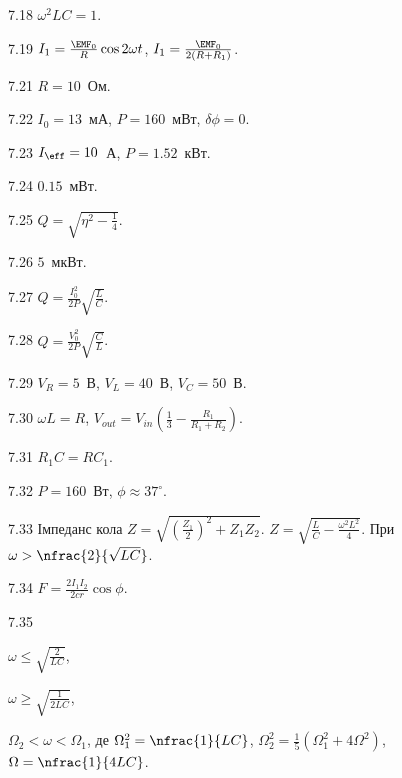 \begin{Solution}{7.{18}}
	$\omega^2LC = 1$.
\end{Solution}
\begin{Solution}{7.{19}}
	$I_1 = \frac{\EMF_0}{R}\cos 2\omega t$, $I_1 = \frac{\EMF_0}{2(R + R_1)}$.
\end{Solution}
\begin{Solution}{7.{21}}
	$R = 10$~Ом.
\end{Solution}
\begin{Solution}{7.{22}}
	$I_0 = 13$~мА, $P = 160$~мВт, $\delta\phi = 0$.
\end{Solution}
\begin{Solution}{7.{23}}
	$I_{\eff} = 10$~А, $P = 1.52$~кВт.
\end{Solution}
\begin{Solution}{7.{24}}
	$0.15$~мВт.
\end{Solution}
\begin{Solution}{7.{25}}
	$Q = \sqrt{\eta^2 - \frac14}$.
\end{Solution}
\begin{Solution}{7.{26}}
	$5$~мкВт.
\end{Solution}
\begin{Solution}{7.{27}}
	$Q = \frac{I_0^2}{2P}\sqrt{\frac{L}{C}}$.
\end{Solution}
\begin{Solution}{7.{28}}
	$Q = \frac{V_0^2}{2P}\sqrt{\frac{C}{L}}$.
\end{Solution}
\begin{Solution}{7.{29}}
	$V_R = 5$~В, $V_L = 40$~В, $V_C = 50$~В.
\end{Solution}
\begin{Solution}{7.{30}}
	$\omega L = R$, $V_{out} = V_{in} \left( \frac13 - \frac{R_1}{R_1 + R_2}\right) $.
\end{Solution}
\begin{Solution}{7.{31}}
	$R_1C = RC_1$.
\end{Solution}
\begin{Solution}{7.{32}}
	$P = 160$~Вт, $\phi \approx 37^\circ$.
\end{Solution}
\begin{Solution}{7.{33}}
	Імпеданс кола $Z = \sqrt{\left( \frac{Z_1}{2}\right)^2 + Z_1Z_2}$.
	$Z = \sqrt{\frac{L}{C} - \frac{\omega^2L^2}{4}}$. При $\omega > \nfrac{2}{\sqrt{LC}}$.
\end{Solution}
\begin{Solution}{7.{34}}
	$F = \frac{2I_1I_2}{2cr}\cos\phi$.
\end{Solution}
\begin{Solution}{7.{35}}
	\begin{enumerate*}[label=\alph*)]
		\item $\omega \le \sqrt{\frac{2}{LC}}$,
		\item $\omega \ge \sqrt{\frac{1}{2LC}}$,
		\item $\Omega_2 < \omega < \Omega_1$, де $\Omega_1^2 = \nfrac{1}{LC} $, $\Omega_2^2 = \frac15 \left( \Omega_1^2 + 4\Omega^2\right)  $, $\Omega = \nfrac{1}{4LC}$.
	\end{enumerate*}
\end{Solution}
